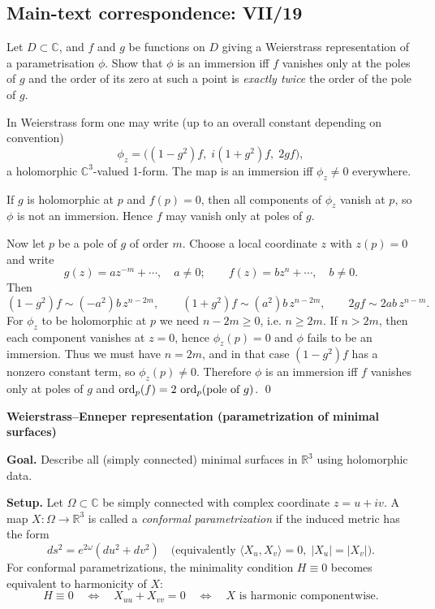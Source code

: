 \subsection*{Main-text correspondence: VII/19}

\begin{problem}
\label{prob:cp-vii-0026}
Let $D\subset\mathbb C$, and $f$ and $g$ be functions on $D$ giving a Weierstrass representation of a
	parametrisation $\phi$. Show that $\phi$ is an immersion iff $f$ vanishes only at the poles of $g$ and the
	order of its zero at such a point is \emph{exactly twice} the order of the pole of $g$.
	
	\medskip
\end{problem}

\begin{solution}
In Weierstrass form one may write (up to an overall constant depending on convention)
	\[
	\phi_z = \big((1-g^2)f,\; i(1+g^2)f,\; 2gf\big),
	\]
	a holomorphic $\mathbb C^3$-valued 1-form. The map is an immersion iff $\phi_z\neq 0$ everywhere.
	
	If $g$ is holomorphic at $p$ and $f(p)=0$, then all components of $\phi_z$ vanish at $p$, so $\phi$ is not an
	immersion. Hence $f$ may vanish only at poles of $g$.
	
	Now let $p$ be a pole of $g$ of order $m$. Choose a local coordinate $z$ with $z(p)=0$ and write
	\[
	g(z)=a z^{-m}+\cdots,\quad a\neq 0;\qquad f(z)=b z^{n}+\cdots,\quad b\neq 0.
	\]
	Then
	\[
	(1-g^2)f \sim (-a^2)b\,z^{n-2m},\qquad (1+g^2)f\sim (a^2)b\,z^{n-2m},\qquad 2gf\sim 2ab\,z^{n-m}.
	\]
	For $\phi_z$ to be holomorphic at $p$ we need $n-2m\ge 0$, i.e. $n\ge 2m$.
	If $n>2m$, then each component vanishes at $z=0$, hence $\phi_z(p)=0$ and $\phi$ fails to be an immersion.
	Thus we must have $n=2m$, and in that case $(1-g^2)f$ has a nonzero constant term, so $\phi_z(p)\neq 0$.
	Therefore $\phi$ is an immersion iff $f$ vanishes only at poles of $g$ and $\operatorname{ord}_p(f)=2\,\operatorname{ord}_p(\text{pole of }g)$.
	\qed
	
	\par\medskip\noindent\textbf{Weierstrass--Enneper representation (parametrization of minimal surfaces)}\par\smallskip

	
	\textbf{Goal.} Describe all (simply connected) minimal surfaces in $\mathbb{R}^3$ using holomorphic data.
	
	\medskip
	\textbf{Setup.}
	Let $\Omega\subset\mathbb{C}$ be simply connected with complex coordinate $z=u+iv$.
	A map $X:\Omega\to\mathbb{R}^3$ is called a \emph{conformal parametrization} if the induced metric has the form
	\[
	ds^2 = e^{2\omega}(du^2+dv^2)
	\quad\text{(equivalently } \langle X_u,X_v\rangle=0,\; |X_u|=|X_v|\text{)}.
	\]
	For conformal parametrizations, the minimality condition $H\equiv 0$ becomes equivalent to harmonicity of $X$:
	\[
	H\equiv 0 \quad\Longleftrightarrow\quad X_{uu}+X_{vv}=0
	\quad\Longleftrightarrow\quad X \text{ is harmonic componentwise.}
	\]
	

\end{solution}
